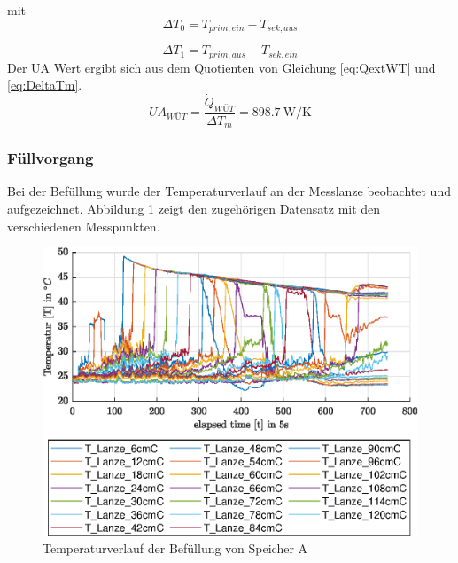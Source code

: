 mit
\begin{equation}
	\label{eq:DeltaT0}
	\Delta T_{0} = T_{prim,ein} - T_{sek,aus}
\end{equation}

\begin{equation}
	\label{eq:DeltaT1}
	\Delta T_{1} = T_{prim,aus} - T_{sek,ein}
\end{equation}
Der UA Wert ergibt sich aus dem Quotienten von Gleichung \ref{eq:QextWT} und \ref{eq:DeltaTm}.
\begin{equation}
	\label{eq:UAext}
	UA_{WÜT} = \frac{\dot Q_{WÜT}}{\Delta T_{m}} = \SI{898,7}{\watt\per\kelvin}
\end{equation}

\subsubsection{Füllvorgang}
Bei der Befüllung wurde der Temperaturverlauf an der Messlanze beobachtet und aufgezeichnet. Abbildung \ref{fig:SpAfill} zeigt den zugehörigen Datensatz mit den verschiedenen Messpunkten.

\begin{figure}[H]
	\centering
	\includegraphics[width=\textwidth]{../DATA/SpA_Lanzen.eps}
	\caption[Temperaturverlauf Speicher A]{Temperaturverlauf der Befüllung von Speicher A}
	\label{fig:SpAfill}
\end{figure}

